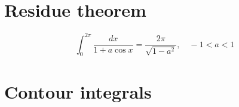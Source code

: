 \documentclass{../../large}
\begin{document}
\section{Residue theorem}
\begin{prb}

\end{prb}


\begin{prb}
\[\int_0^{2\pi}\frac{dx}{1+a\cos x}=\frac{2\pi}{\sqrt{1-a^2}},\quad-1<a<1\]
\end{prb}



\section{Contour integrals}
\end{document}
